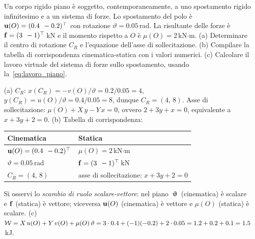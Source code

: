\begin{esercizio}
	\label{ex:C03_dualismo_piano}
	
	Un corpo rigido piano è soggetto, contemporaneamente, a uno spostamento rigido infinitesimo e a un sistema di forze. Lo spostamento del polo è $\mathbf{u}(O) = (0.4\;\,-0.2)^\top$ con rotazione $\vartheta = 0.05$\,rad. La risultante delle forze è $\mathbf{f} = (3\;\,-1)^\top$\,kN e il momento rispetto a $O$ è $\mu(O) = 2$\,kN$\cdot$m.
	(a) Determinare il centro di rotazione $C_R$ e l'equazione dell'asse di sollecitazione.
	(b) Compilare la tabella di corrispondenza cinematica-statica con i valori numerici.
	(c) Calcolare il lavoro virtuale del sistema di forze sullo spostamento, usando la~\eqref{eq:lavoro_piano}.
	
	\risultato (a) $C_R$: $x(C_R) = -v(O)/\vartheta = 0.2/0.05 = 4$, $y(C_R) = u(O)/\vartheta = 0.4/0.05 = 8$, dunque $C_R = (4,\,8)$. Asse di sollecitazione: $\mu(O) + X\,y - Y\,x = 0$, ovvero $2 + 3y + x = 0$, equivalente a $x + 3y + 2 = 0$. (b) Tabella di corrispondenza:
	\begin{center}
		\begin{tabular}{ll}
			\toprule
			\textbf{Cinematica} & \textbf{Statica} \\
			\midrule
			$\mathbf{u}(O) = (0.4\;\,-0.2)^\top$ & $\mu(O) = 2$\,kN$\cdot$m \\
			$\vartheta = 0.05$\,rad & $\mathbf{f} = (3\;\,-1)^\top$\,kN \\
			$C_R = (4,\,8)$ & asse di sollecitazione: $x + 3y + 2 = 0$ \\
			\bottomrule
		\end{tabular}
	\end{center}
	Si osservi lo \textit{scambio di ruolo scalare-vettore}: nel piano $\bm{\upvartheta}$ (cinematica) è scalare e $\mathbf{f}$ (statica) è vettore; viceversa $\mathbf{u}(O)$ (cinematica) è vettore e $\mu(O)$ (statica) è scalare. (c) $\mathcal{W} = X\,u(O) + Y\,v(O) + \mu(O)\,\vartheta = 3 \cdot 0.4 + (-1)(-0.2) + 2 \cdot 0.05 = 1.2 + 0.2 + 0.1 = 1.5$\,kJ.
	
\end{esercizio}


